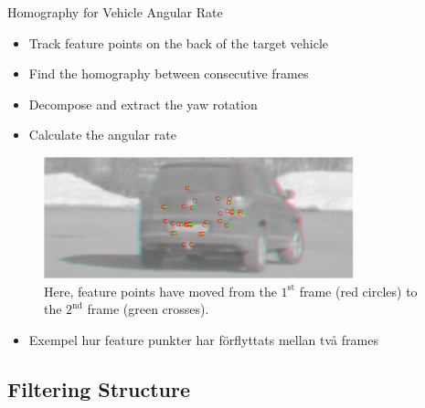 \documentclass{beamer}
\renewcommand{\a}{\r{a}\xspace}
\renewcommand{\o}{\"o\xspace}
\begin{document}
\begin{frame}{Homography for Vehicle Angular Rate}
	\begin{itemize}
		\item Track feature points on the back of the target vehicle
		\item Find the homography between consecutive frames
		\item Decompose and extract the yaw rotation
		\item Calculate the angular rate
	\end{itemize}
	\begin{figure}
		\centering
		\includegraphics[width=0.8\textwidth]{feature_point_correspondence}
		\caption{Here, feature points have moved from the $1^\text{st}$ frame (red circles) to the $2^\text{nd}$ frame (green crosses).}
	\end{figure}

	\note
	{
		\begin{itemize}
			\item Exempel hur feature punkter har f\o{}rflyttats mellan tv\a frames
		\end{itemize}
	}
\end{frame}

\subsection{Filtering Structure}
\end{document}
